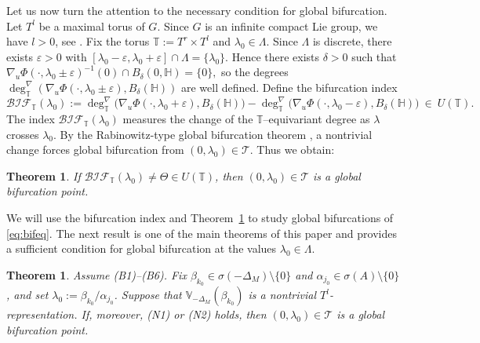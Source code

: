 \documentclass[reqno,twoside,12pt]{amsart}
\newtheorem{Theorem}[Remark]{Theorem}
\newcommand{\bH}{\mathbb{H}}
\newcommand{\bT}{\mathbb{T}}
\newcommand{\bV}{\mathbb{V}}
\newcommand{\cT}{\mathcal{T}}
\numberwithin{equation}{section} \errorcontextlines=0
\newcommand{\bif}{\mathcal{BIF}}
\begin{document}
Let us now turn the attention to the necessary condition for global bifurcation.
Let $T^{l}$ be a maximal torus of $G$. Since $G$ is an infinite compact Lie group, we have $l>0$, see \cite[Chapter~IV]{BrockerDieck}.
Fix the torus
$\bT:=T^{r}\times T^{l}$ and $\lambda_{0}\in\Lambda$. Since $\Lambda$ is discrete, there exists $\varepsilon>0$ with $[\lambda_{0}-\varepsilon,\lambda_{0}+\varepsilon]\cap\Lambda=\{\lambda_{0}\}$. Hence there exists $\delta>0$ such that
$
\nabla_{u}\Phi(\cdot,\lambda_{0}\pm\varepsilon)^{-1}(0)\cap B_{\delta}(0,\bH)=\{0\},
$
so the degrees $\deg^{\nabla}_{\bT}(\nabla_{u}\Phi(\cdot,\lambda_{0}\pm\varepsilon),B_{\delta}(\bH))$ are well defined. Define the bifurcation index
\begin{equation}\label{eq:indbif}
\bif_{\bT}(\lambda_{0})
:=
\deg^{\nabla}_{\bT}\bigl(\nabla_{u}\Phi(\cdot,\lambda_{0}+\varepsilon),B_{\delta}(\bH)\bigr)
-
\deg^{\nabla}_{\bT}\bigl(\nabla_{u}\Phi(\cdot,\lambda_{0}-\varepsilon),B_{\delta}(\bH)\bigr)
\ \in\ U(\bT).
\end{equation}
The index $\bif_{\bT}(\lambda_{0})$ measures the change of the $\bT$--equivariant degree as $\lambda$ crosses $\lambda_{0}$. By the Rabinowitz-type global bifurcation theorem \cite[Theorem~4.9]{Ryb2005milano}, a nontrivial change forces global bifurcation from $(0,\lambda_{0})\in\mathcal T$. Thus we obtain:

\begin{Theorem}\label{thm:bif-index-global}
If $\bif_{\bT}(\lambda_{0})\neq\Theta\in U(\bT)$, then $(0,\lambda_0)\in\mathcal T$ is a global bifurcation point.
\end{Theorem}

We will use the bifurcation index and Theorem~\ref{thm:bif-index-global} to study global bifurcations of \eqref{eq:bifeq}.
The next result is one of the main theorems of this paper and provides a sufficient condition for global bifurcation at the values $\lambda_{0}\in\Lambda$.

\begin{Theorem}\label{thm:global-bifurcation}
Assume \textnormal{(B1)}--\textnormal{(B6)}. Fix $\beta_{k_{0}}\in\sigma(-\Delta_{M})\setminus\{0\}$ and $\alpha_{j_{0}}\in\sigma(A)\setminus\{0\}$, and set $\lambda_{0}:=\beta_{k_{0}}/\alpha_{j_{0}}$.
Suppose that $\bV_{-\Delta_{M}}(\beta_{k_{0}})$ is a nontrivial $T^{l}$-representation.
If, moreover, \textnormal{(N1)} or \textnormal{(N2)} holds,
then $(0,\lambda_{0})\in\cT$ is a global bifurcation point.
\end{Theorem}
\end{document}
